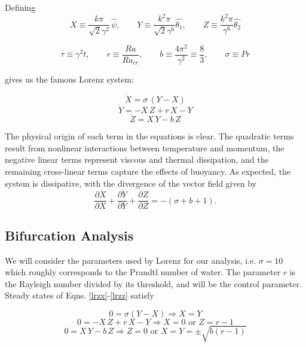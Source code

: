 \documentclass[paper=a4, fontsize=11pt]{scrartcl}
\numberwithin{equation}{section}		%
\numberwithin{figure}{section}			%
\numberwithin{table}{section}				%
\begin{document}
\noindent Defining 
\begin{equation}
	X \equiv \frac{k \pi}{\sqrt{2}\gamma^2} \, \hat{\psi}, \qquad Y \equiv \frac{k^2 \pi}{\sqrt{2}\gamma^6} \hat{\theta_1}, \qquad Z \equiv \frac{k^2 \pi}{\gamma^6} \hat{\theta_2}
	\label{ND1}
\end{equation}

\begin{equation}
	\tau \equiv \gamma^2 t , \qquad r \equiv \frac{Ra}{Ra_{cr}}, \qquad b \equiv \frac{4\pi^2}{\gamma^2} \equiv \frac{8}{3}, \qquad \sigma \equiv Pr
	\label{ND2}
\end{equation}

\noindent gives us the famous Lorenz system:

\begin{equation}
	\dot{X} = \sigma \, (Y-X)
	\label{lrzx}
\end{equation}
\begin{equation}
	\dot{Y} = -X\,Z + r\,X - Y
	\label{lrzy}
\end{equation}
\begin{equation}
	\dot{Z} = X\,Y-b\,Z
	\label{lrzz}
\end{equation}

The physical origin of each term in the equations is clear. The quadratic terms result from nonlinear interactions between temperature and momentum, the negative linear terms represent viscous and thermal dissipation, and the remaining cross-linear terms capture the effects of buoyancy. As expected, the system is dissipative, with the divergence of the vector field given by 
\begin{equation} 
	\frac{\partial \dot{X}}{\partial X} + \frac{\partial \dot{Y}}{\partial Y} + \frac{\partial \dot{Z}}{\partial Z} = - (\sigma + b + 1). 
\end{equation}

\subsection{Bifurcation Analysis}
We will consider the parameters used by Lorenz for our analysis, i.e. $\sigma = 10$ which roughly corresponds to the Prandtl number of water. The parameter $r$ is the Rayleigh number divided by its threshold, and will be the control parameter. \\

\noindent Steady states of Eqns. \ref{lrzx}-\ref{lrzz} satisfy 

\begin{equation}
	0 = \sigma (Y-X) \Rightarrow X = Y
\end{equation}
\begin{equation}
	0 = - X \, Z + r \, X - Y \Rightarrow X = 0 \text{ or } Z = r - 1
\end{equation}
\begin{equation}
	0 = X \, Y - b \, Z \Rightarrow Z = 0 \text{ or } X = Y = \pm \sqrt{b(r-1)}
\end{equation}
\end{document}

